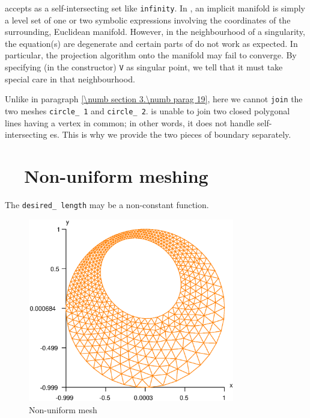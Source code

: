 {\ManiFEM} accepts as {\small\tt{}} a self-intersecting set like {\small\tt infinity}.
In {\maniFEM}, an implicit manifold is simply a level set of one or two symbolic expressions
involving the coordinates of the surrounding, Euclidean manifold.
However, in the neighbourhood of a singularity, the equation(s) are degenerate and certain
parts of {\maniFEM} do not work as expected.
In particular, the projection algorithm onto the manifold may fail to converge.
By specifying (in the {\small\tt{}} constructor) {\small\tt V} as singular point,
we tell {\maniFEM} that it must take special care in that neighbourhood.

Unlike in paragraph \ref{\numb section 3.\numb parag 19}, here we cannot {\small\tt join} the
two meshes {\small\tt circle\_\,1} and {\small\tt circle\_\,2}.
{\ManiFEM} is unable to join two closed polygonal lines having a vertex in common;
in other words, it does not handle self-intersecting {\small\tt{}}es.
This is why we provide the two pieces of boundary separately.


\section{~~Non-uniform meshing}\label{\numb section 3.\numb parag 23}

The {\small\tt desired\_\,length} may be a non-constant function.

\begin{figure}[ht] \centering
 \includegraphics[width=90mm]{disk-non-unif}
  \caption{Non-uniform mesh}
  \label{\numb section 3.\numb fig 11}
\end{figure}


